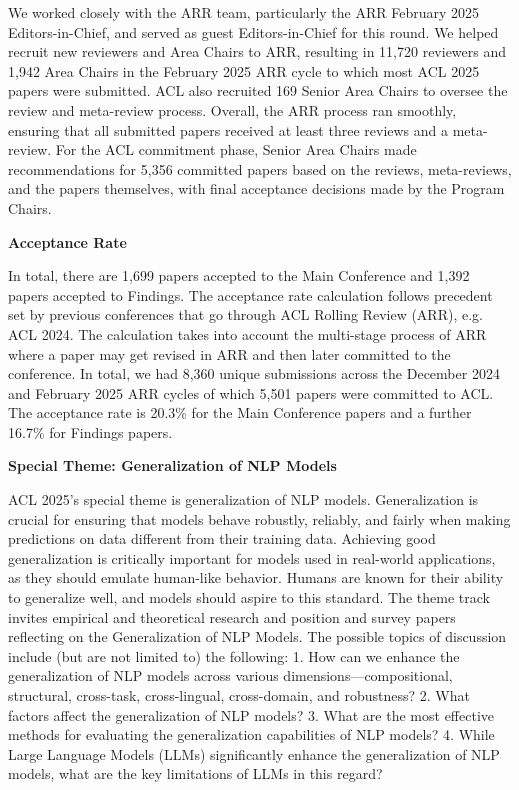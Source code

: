 We worked closely with the ARR team, particularly the ARR February 2025 Editors-in-Chief, and served as guest Editors-in-Chief for this round. We helped recruit new reviewers and Area Chairs to ARR, resulting in 11,720 reviewers and 1,942 Area Chairs in the February 2025 ARR cycle to which most ACL 2025 papers were submitted. ACL also recruited 169 Senior Area Chairs to oversee the review and meta-review process. Overall, the ARR process ran smoothly, ensuring that all submitted papers received at least three reviews and a meta-review. For the ACL commitment phase, Senior Area Chairs made recommendations for 5,356 committed papers based on the reviews, meta-reviews, and the papers themselves, with final acceptance decisions made by the Program Chairs.

\textbf{Acceptance Rate}

In total, there are 1,699 papers accepted to the Main Conference and 1,392 papers accepted to Findings. The acceptance rate calculation follows precedent set by previous conferences that go through ACL Rolling Review (ARR), e.g. ACL 2024. The calculation takes into account the multi-stage process of ARR where a paper may get revised in ARR and then later committed to the conference. In total, we had 8,360 unique submissions across the December 2024 and February 2025 ARR cycles of which 5,501 papers were committed to ACL. The acceptance rate is 20.3\% for the Main Conference papers and a further 16.7\% for Findings papers.

\textbf{Special Theme: Generalization of NLP Models}

ACL 2025's special theme is generalization of NLP models. Generalization is crucial for ensuring that models behave robustly, reliably, and fairly when making predictions on data different from their training data. Achieving good generalization is critically important for models used in real-world applications, as they should emulate human-like behavior. Humans are known for their ability to generalize well, and models should aspire to this standard. The theme track invites empirical and theoretical research and position and survey papers reflecting on the Generalization of NLP Models. The possible topics of discussion include (but are not limited to) the following:
1. How can we enhance the generalization of NLP models across various dimensions—compositional, structural, cross-task, cross-lingual, cross-domain, and robustness?
2. What factors affect the generalization of NLP models?
3. What are the most effective methods for evaluating the generalization capabilities of NLP models?
4. While Large Language Models (LLMs) significantly enhance the generalization of NLP models, what are the key limitations of LLMs in this regard?

